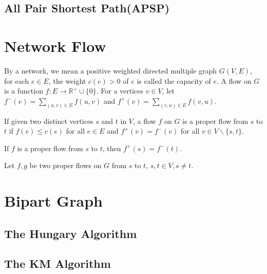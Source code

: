 	\subsection{All Pair Shortest Path(APSP)}

\section{Network Flow}
By a network, we mean a positive weighted directed multiple graph $G(V, E)$,
for each $e \in E$, the weight $c(e) > 0$ of $e$ is called the capacity of $e$.
A flow on $G$ is a function $f : E \to \mathbb{R}^+ \cup \{0\}$.
For a vertices $v \in V$, let $f^-(v) = \sum_{(u, v) \in E} f(u, v)$
and $f^+(v) = \sum_{(v, u) \in E} f(v, u)$.

If given two distinct vertices $s$ and $t$ in $V$, 
a flow $f$ on $G$ is a proper flow from $s$ to $t$ 
if $f(e) \leq c(e)$ for all $e \in E$ and $f^+(v) = f^-(v)$ for all $v \in V \backslash \{s, t\}$.

\begin{pro}
If $f$ is a proper flow from $s$ to $t$, then $f^+(s) = f^-(t)$.
\end{pro}

Let $f, g$ be two proper flows on $G$ from $s$ to $t$, $s, t \in V, s \neq t$.

\section{Bipart Graph}
	\subsection{The Hungary Algorithm}
	\subsection{The KM Algorithm}

